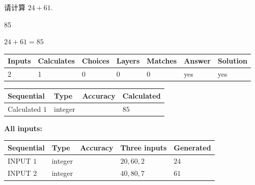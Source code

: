 \documentclass{ctexart}
\begin{document}
  
 
请计算 $ %
24 +  %
61 $.
 
 
 
\noindent{}
 
 

85
 
 
\noindent{}
 
 

 
 
 
\noindent{}
 
 

$ %
24 +  %
61=   %
85$
 
 
\noindent{}
 
 

 
   
   
   
   
\noindent\begin{tabular}{|l|l|l|l|l|l|l|}
 \hline
Inputs & Calculates & Choices & Layers & Matches & Answer & Solution \\ \hline
 2  & 
 1  & 
 0
  & 
 0  & 
 0  & 
  yes & 
  yes 
  \\ \hline
 \end{tabular}
   
   
   
   
\noindent{}
   
   
  
  
\noindent\begin{tabular}{|l|l|l|l|}
\hline
 Sequential & Type & Accuracy & Calculated \\ 
\hline
 
 
  Calculated $  1 $ & integer &  & 
  $ 85 $ 
 \\  \hline  
 \end{tabular}
   
   
   
   
\noindent\vspace{0.1in}\hspace{-0.08in} {\textbf{\Large{All inputs: }}}
   
   
  
  
\noindent\begin{tabular}{|l|l|l|l|l|}
\hline
 Sequential & Type & Accuracy & Three inputs & Generated \\ 
\hline
 
 
  INPUT $  1 $ & integer &  & $
 20
 , 
 60
 , 
 2
 $ & $ 24 $ 
 \\  \hline  
 
 
  INPUT $  2 $ & integer &  & $
 40
 , 
 80
 , 
 7
 $ & $ 61 $ 
 \\  \hline  
 \end{tabular}
   
\end{document}
